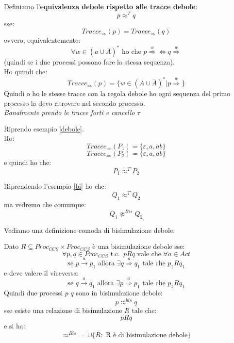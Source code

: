 \documentclass[a4paper,12pt, oneside]{book}
\begin{document}
\begin{definizione}
  Definiamo l'\textbf{equivalenza debole rispetto alle tracce debole}:
  \[p\approx^T q\]
  sse:
  \[Tracce_{\Rightarrow}(p)=Tracce_{\Rightarrow}(q)\]
  ovvero, equivalentemente:
  \[\forall w\in(a\cup \overline{A})^*\mbox{ ho che }p\stackrel{w}{\Rightarrow}
    \iff q\stackrel{w}{\Rightarrow}\]
  (quindi se i due processi possono fare la stessa sequenza).\\
  Ho quindi che:
  \[Tracce_{\Rightarrow}(p)=\{w\in(A\cup \overline{A})^*|
    p\stackrel{w}{\Rightarrow}\}\]
  Quindi o ho le stesse tracce con la regola debole ho ogni sequenza del primo
  processo la devo ritrovare nel secondo processo.\\
  \textit{Banalmente prendo le tracce forti e cancello $\tau$}
\end{definizione}
\begin{esempio}
  Riprendo esempio \ref{debole}.\\
  Ho:
  \[Tracce_{\Rightarrow}(P_1)=\{\varepsilon,a,ab\}\]
  \[Tracce_{\Rightarrow}(P_2)=\{\varepsilon,a,ab\}\]
  e quindi ho che:
  \[P_1\approx^T P_2\]
\end{esempio}
\begin{esempio}
  Riprendendo l'esempio \ref{bi} ho che:
  \[Q_1\approx^T Q_2\]
  ma vedremo che comunque:
  \[Q_1\not\approx^{Bis} Q_2\]
\end{esempio}
Vediamo una definizione comoda di bisimulazione debole:
\begin{definizione}
  Dato $R\subseteq Proc_{CCS}\times Proc_{CCS}$ è una bisimulazione debole sse:
  \[\forall p,q\in Proc_{CCS}\mbox{ t.c. }\,pRq \mbox{ vale che } \forall a\in
    Act\] 
  \[\mbox{se }p\stackrel{a}{\rightarrow}p_1\mbox{ allora }\exists
    q\stackrel{a}{\Rightarrow}q_1 \mbox{ tale che } p_1Rq_1\]
  e deve valere il viceversa:
  \[\mbox{se }q\stackrel{a}{\rightarrow}q_1\mbox{ allora }\exists
    p\stackrel{a}{\Rightarrow}p_1 \mbox{ tale che } p_1Rq_1\]
  Quindi due processi $p$ $q$ sono in bisimulazione debole:
  \[p\approx^{bis} q\] sse esiste una relazione di bisimulazione $R$ tale che:
  \[pRq\]
  e si ha:
  \[\approx^{Bis}=\cup\{R:\mbox{ R è di bisimulazione debole}\}\]
\end{definizione}
\end{document}
